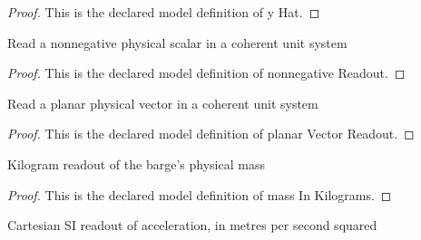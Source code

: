 \begin{proof}
  This is the declared model definition of y Hat.
\end{proof}
\begin{definition}
  \label{def:physics:phyx-mini-0760:phyxminiproblems-problemphyxmini0760-nonnegativereadout}
  Read a nonnegative physical scalar in a coherent unit system
\end{definition}
\begin{proof}
  This is the declared model definition of nonnegative Readout.
\end{proof}
\begin{definition}
  \label{def:physics:phyx-mini-0760:phyxminiproblems-problemphyxmini0760-planarvectorreadout}
  Read a planar physical vector in a coherent unit system
\end{definition}
\begin{proof}
  This is the declared model definition of planar Vector Readout.
\end{proof}
\begin{definition}
  \label{def:physics:phyx-mini-0760:phyxminiproblems-problemphyxmini0760-massinkilograms}
  Kilogram readout of the barge's physical mass
\end{definition}
\begin{proof}
  This is the declared model definition of mass In Kilograms.
\end{proof}
\begin{definition}
  \label{def:physics:phyx-mini-0760:phyxminiproblems-problemphyxmini0760-accelerationinmeterspersecondsquared}
  Cartesian SI readout of acceleration, in metres per second squared
\end{definition}
